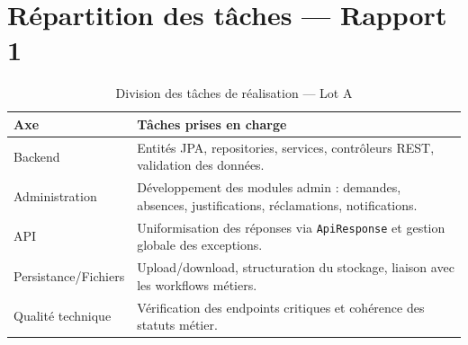 \section{Répartition des tâches — Rapport 1}

\begin{table}[H]
\centering
\caption{Division des tâches de réalisation — Lot A}
\label{tab:taches_realisation_lot_a}
\begin{tabularx}{\textwidth}{lX}
\toprule
\textbf{Axe} & \textbf{Tâches prises en charge} \\
\midrule
Backend & Entités JPA, repositories, services, contrôleurs REST, validation des données. \\
Administration & Développement des modules admin : demandes, absences, justifications, réclamations, notifications. \\
API & Uniformisation des réponses via \texttt{ApiResponse} et gestion globale des exceptions. \\
Persistance/Fichiers & Upload/download, structuration du stockage, liaison avec les workflows métiers. \\
Qualité technique & Vérification des endpoints critiques et cohérence des statuts métier. \\
\bottomrule
\end{tabularx}
\end{table}

\newpage
